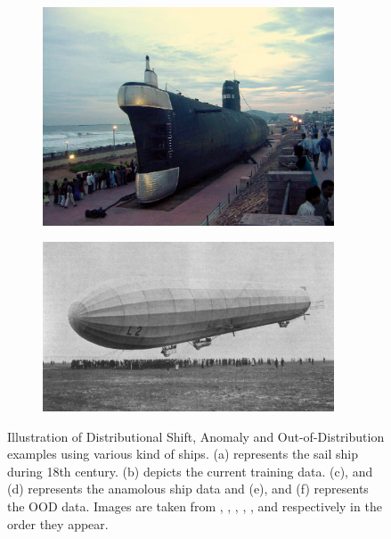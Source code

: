 \begin{figure}[h!]
\begin{subfigure}{0.333\textwidth}
        \includegraphics[height=0.15\textheight,width=0.95\textwidth]{images/intro_ood_anomaly/ood_submarine.jpg}
        \caption{}
        \label{fig:ood_submarine}
    \end{subfigure}
    \begin{subfigure}{0.333\textwidth}
        \centering
        \includegraphics[height=0.15\textheight,width=0.95\textwidth]{images/intro_ood_anomaly/ood_airship.jpg}
        \caption{}
        \label{fig:ood_airship}
    \end{subfigure}
    \caption{Illustration of Distributional Shift, Anomaly and Out-of-Distribution examples using various kind of ships. (a) represents the sail ship during 18th century. (b) depicts the current training data.
    (c), and (d) represents the anamolous ship data and (e), and (f) represents the OOD data. Images are taken from \cite{old_ship}, \cite{train_cruiser}, \cite{container},
    \cite{titanic}, \cite{submarine}, and \cite{airship} respectively in the order they appear.}
\end{figure}

